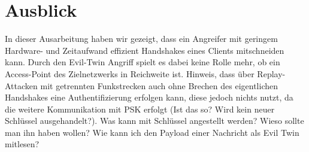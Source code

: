 \section{Ausblick}
In dieser Ausarbeitung haben wir gezeigt, dass ein Angreifer mit geringem Hardware- und Zeitaufwand effizient Handshakes eines Clients mitschneiden kann.
Durch den Evil-Twin Angriff spielt es dabei keine Rolle mehr, ob ein Access-Point des Zielnetzwerks in Reichweite ist.
Hinweis, dass über Replay-Attacken mit getrennten Funkstrecken auch ohne Brechen des eigentlichen Handshakes eine Authentifizierung erfolgen kann, diese jedoch nichts nutzt, da die weitere Kommunikation mit PSK erfolgt (Ist das so? Wird kein neuer Schlüssel ausgehandelt?).
Was kann mit Schlüssel angestellt werden? Wieso sollte man ihn haben wollen? 
Wie kann ich den Payload einer Nachricht als Evil Twin mitlesen? 